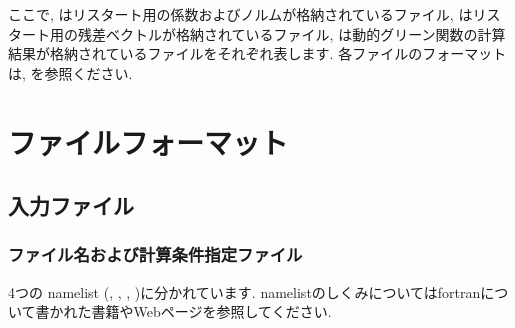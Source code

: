 \documentclass[letterpaper,10pt,dvipdfmx,openany]{sphinxmanual}
\begin{document}
ここで,
 はリスタート用の係数およびノルムが格納されているファイル,
 はリスタート用の残差ベクトルが格納されているファイル,
 は動的グリーン関数の計算結果が格納されているファイルをそれぞれ表します.
各ファイルのフォーマットは, {\hyperref[\detokenize{shiftk_format_ja:revec}]{}} \sphinxhyphen{} {\hyperref[\detokenize{shiftk_format_ja:dynamicalg}]{}} を参照ください.


\chapter{ファイルフォーマット}
\label{\detokenize{shiftk_format_ja:fileformat}}\label{\detokenize{shiftk_format_ja:id1}}\label{\detokenize{shiftk_format_ja::doc}}

\section{入力ファイル}
\label{\detokenize{shiftk_format_ja:id2}}

\subsection{ファイル名および計算条件指定ファイル}
\label{\detokenize{shiftk_format_ja:modpara}}\label{\detokenize{shiftk_format_ja:id3}}
4つの namelist (, , , )に分かれています.
namelistのしくみについてはfortranについて書かれた書籍やWebページを参照してください.

\begin{sphinxVerbatim}[commandchars=\\\{\}]
    
    
  
  
  
  
  
    
    
    
    
     
      
    
\end{sphinxVerbatim}
\end{document}

